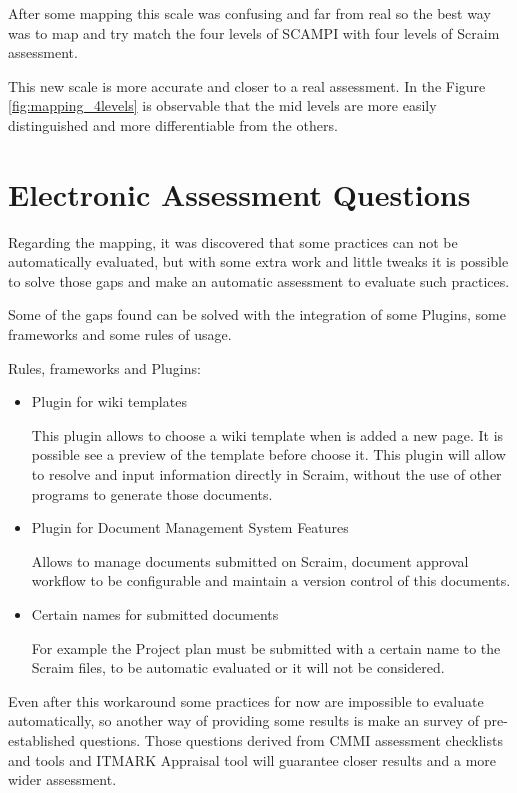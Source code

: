 After some mapping this scale was confusing and far from real so the best way was to map and try match the four levels of SCAMPI with four levels of Scraim assessment.

This new scale is more accurate and closer to a real assessment. In the Figure \ref{fig:mapping_4levels} is observable that the mid levels are more easily distinguished and more differentiable from the others. 

\section{Electronic Assessment Questions}

Regarding the mapping, it was discovered  that some practices can not be automatically evaluated, but with some extra work and little tweaks it is possible to solve those gaps and make an automatic assessment to evaluate such practices.

Some of the gaps found can be solved with the integration of some Plugins, some frameworks and some rules of usage.

Rules, frameworks and Plugins:
\begin{itemize}
	\item Plugin for wiki templates
	
	This plugin allows to choose a wiki template when is added a new page. It is possible see a preview of the template before choose it.
	This plugin will allow to resolve and input information directly in Scraim, without the use of other programs to generate those documents.
	
	\item Plugin for Document Management System Features
	
	Allows to manage documents submitted on Scraim, document approval workflow to be configurable and maintain a version control of this documents.
	
	\item Certain names for submitted documents
	
	For example the Project plan must be submitted with a certain name to the Scraim files, to be automatic evaluated or it will not be considered.
	
\end{itemize}

Even after this workaround some practices for now are impossible to evaluate automatically, so another way of providing some results is make an survey of pre-established questions. Those questions derived from CMMI assessment checklists and tools and ITMARK Appraisal tool will guarantee closer results and a more wider assessment.
